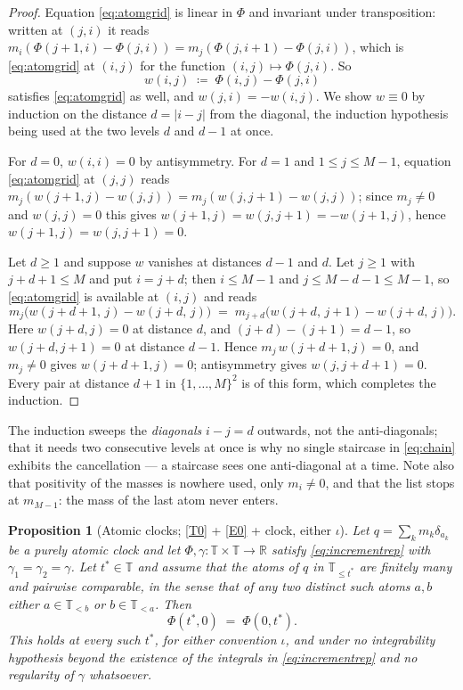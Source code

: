 \documentclass[11pt,a4paper]{article}
\theoremstyle{plain}
\newtheorem{proposition}[theorem]{Proposition}
\theoremstyle{definition}
\theoremstyle{remark}
\newcommand{\R}{\mathbb{R}}
\newcommand{\T}{\mathbb{T}}                     %
\begin{document}
\begin{proof}
  Equation \eqref{eq:atomgrid} is linear in $\Phi$ and invariant under
  transposition: written at $(j,i)$ it reads
  $m_i(\Phi(j{+}1,i) - \Phi(j,i)) = m_j(\Phi(j,i{+}1) - \Phi(j,i))$, which is
  \eqref{eq:atomgrid} at $(i,j)$ for the function $(i,j) \mapsto \Phi(j,i)$.  So
  \[
    w(i,j) \;\coloneqq\; \Phi(i,j) - \Phi(j,i)
  \]
  satisfies \eqref{eq:atomgrid} as well, and $w(j,i) = -w(i,j)$.  We show
  $w \equiv 0$ by induction on the distance $d = |i-j|$ from the diagonal, the
  induction hypothesis being used at the two levels $d$ and $d-1$ at once.

  For $d = 0$, $w(i,i) = 0$ by antisymmetry.  For $d = 1$ and
  $1 \leq j \leq M-1$, equation \eqref{eq:atomgrid} at $(j,j)$ reads
  $m_j(w(j{+}1,j) - w(j,j)) = m_j(w(j,j{+}1) - w(j,j))$; since $m_j \neq 0$ and
  $w(j,j) = 0$ this gives $w(j{+}1,j) = w(j,j{+}1) = -w(j{+}1,j)$, hence
  $w(j{+}1,j) = w(j,j{+}1) = 0$.

  Let $d \geq 1$ and suppose $w$ vanishes at distances $d-1$ and $d$.  Let
  $j \geq 1$ with $j+d+1 \leq M$ and put $i = j+d$; then $i \leq M-1$ and
  $j \leq M-d-1 \leq M-1$, so \eqref{eq:atomgrid} is available at $(i,j)$ and
  reads
  \[
    m_j \bigl( w(j{+}d{+}1,\,j) - w(j{+}d,\,j) \bigr)
      \;=\; m_{j+d} \bigl( w(j{+}d,\,j{+}1) - w(j{+}d,\,j) \bigr) .
  \]
  Here $w(j{+}d,j) = 0$ at distance $d$, and $(j{+}d) - (j{+}1) = d-1$, so
  $w(j{+}d,j{+}1) = 0$ at distance $d-1$.  Hence $m_j\, w(j{+}d{+}1,j) = 0$, and
  $m_j \neq 0$ gives $w(j{+}d{+}1,j) = 0$; antisymmetry gives
  $w(j,j{+}d{+}1) = 0$.  Every pair at distance $d+1$ in $\{1,\dots,M\}^2$ is of
  this form, which completes the induction.
\end{proof}

The induction sweeps the \emph{diagonals} $i - j = d$ outwards, not the
anti-diagonals; that it needs two consecutive levels at once is why no single
staircase in \eqref{eq:chain} exhibits the cancellation --- a staircase sees one
anti-diagonal at a time.  Note also that positivity of the masses is nowhere
used, only $m_i \neq 0$, and that the list stops at $m_{M-1}$: the mass of the
last atom never enters.

\begin{proposition}[Atomic clocks; \eqref{T0} + \eqref{E0} + clock, either $\iota$]
  \label{prop:atomicdual}
  Let $q = \sum_k m_k \delta_{a_k}$ be a purely atomic clock and let
  $\Phi, \gamma : \T \times \T \to \R$ satisfy \eqref{eq:incrementrep} with
  $\gamma_1 = \gamma_2 = \gamma$.  Let $t^* \in \T$ and assume that the atoms of
  $q$ in $\T_{\leq t^*}$ are finitely many and pairwise comparable, in the sense
  that of any two distinct such atoms $a,b$ either $a \in \T_{<b}$ or
  $b \in \T_{<a}$.  Then
  \[
    \Phi(t^*,0) \;=\; \Phi(0,t^*) .
  \]
  This holds at \emph{every} such $t^*$, for either convention $\iota$, and under
  no integrability hypothesis beyond the existence of the integrals in
  \eqref{eq:incrementrep} and no regularity of $\gamma$ whatsoever.
\end{proposition}
\end{document}
